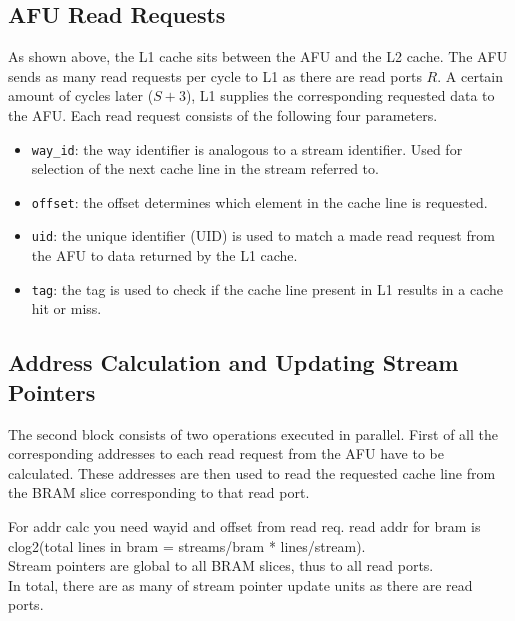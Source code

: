 \subsection{AFU Read Requests}
As shown above, the L1 cache sits between the AFU and the L2 cache. The AFU sends as many read requests per cycle to L1 as there are read ports $R$. A certain amount of cycles later ($S+3$), L1 supplies the corresponding requested data to the AFU. Each read request consists of the following four parameters.
\begin{itemize}
	\item \texttt{way\_id}: the way identifier is analogous to a stream identifier. Used for selection of the next cache line in the stream referred to.
	\item \texttt{offset}: the offset determines which element in the cache line is requested.
	\item \texttt{uid}: the unique identifier (UID) is used to match a made read request from the AFU to data returned by the L1 cache.
	\item \texttt{tag}: the tag is used to check if the cache line present in L1 results in a cache hit or miss.
\end{itemize}

\subsection{Address Calculation and Updating Stream Pointers}

The second block consists of two operations executed in parallel. First of all the corresponding addresses to each read request from the AFU have to be calculated. These addresses are then used to read the requested cache line from the BRAM slice corresponding to that read port.


For addr calc you need wayid and offset from read req. read addr for bram is clog2(total lines in bram = streams/bram * lines/stream).\\
Stream pointers are global to all BRAM slices, thus to all read ports.\\
In total, there are as many of stream pointer update units as there are read ports.\\

